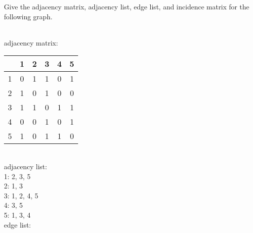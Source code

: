 \documentclass[solutionorbox,answers]{exam}
\begin{document}
\begin{questions}
\question 
Give the adjacency matrix, adjacency list, edge list, and incidence matrix for the following graph. \\
\begin{minipage}{0.3\linewidth}
\end{minipage}
\qquad
\begin{minipage}{0.6\linewidth}
\begin{solutionbox}{4in}                                                                          \\
  adjacency matrix:                                                                                   \\
  \begin{tabular}{c|ccccc}
    & 1 & 2 & 3 & 4 & 5 \\
    \hline
    1 & 0 & 1 & 1 & 0 & 1 \\
    2 & 1 & 0 & 1 & 0 & 0 \\
    3 & 1 & 1 & 0 & 1 & 1 \\
    4 & 0 & 0 & 1 & 0 & 1 \\
    5 & 1 & 0 & 1 & 1 & 0 \\
  \end{tabular}                                                                                       \\
  adjacency list:                                                                                     \\
  1: 2, 3, 5                                                                                          \\
  2: 1, 3                                                                                            \\
  3: 1, 2, 4, 5                                                                                       \\
  4: 3, 5                                                                                            \\
  5: 1, 3, 4                                                                                          \\
  edge list:                                                                                          \\

\end{solutionbox}
\end{minipage}
\end{questions}
\end{document}
